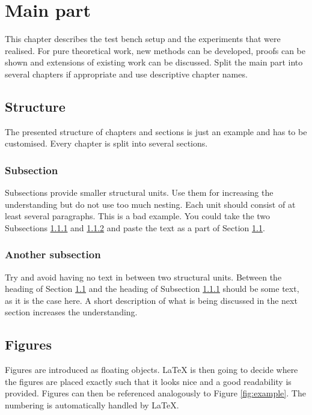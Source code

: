 \chapter{Main part}
\label{cha:mainpart}

This chapter describes the test bench setup and the experiments that were realised. For pure theoretical work, new methods can be developed, proofs can be shown and extensions of existing work can be discussed. Split the main part into several chapters if appropriate and use descriptive chapter names.

\section{Structure}
\label{sec:structure}

The presented structure of chapters and sections is just an example and has to be customised. Every chapter is split into several sections.

\subsection{Subsection}
\label{sec:subsection}

Subsections provide smaller structural units. Use them for increasing the understanding but do not use too much nesting. Each unit should consist of at least several paragraphs. This is a bad example. You could take the two Subsections \ref{sec:subsection} and \ref{sec:anothersubsection} and paste the text as a part of Section \ref{sec:structure}.

\subsection{Another subsection}
\label{sec:anothersubsection}

Try and avoid having no text in between two structural units. Between the heading of Section \ref{sec:structure} and the heading of Subsection \ref{sec:subsection} should be some text, as it is the case here. A short description of what is being discussed in the next section increases the understanding.

\section{Figures}

Figures are introduced as floating objects. LaTeX is then going to decide where the figures are placed exactly such that it looks nice and a good readability is provided. Figures can then be referenced analogously to Figure \ref{fig:example}. The numbering is automatically handled by LaTeX.

